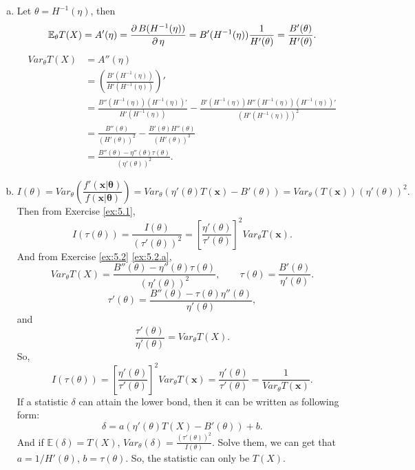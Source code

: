 \begin{solution}
    \begin{enumerate}[(a)]
        \item \label{ex:5.2.a} Let $\theta=H^{-1}(\eta)$, then 
        \[
            \mathbb{E}_\theta T(X) = A'(\eta) =\frac{\partial\, B(H^{-1}(\eta))}{\partial\, \eta}=B'(H^{-1}(\eta))\frac{1}{H'(\theta)}=\frac{B'(\theta)}{H'(\theta)}. 
        \]
        \[
            \begin{aligned}
                Var_\theta T(X)&=A''(\eta)\\
                &=\left(\frac{B'(H^{-1}(\eta))}{H'(H^{-1}(\eta))}\right)'\\
                &=\frac{B''(H^{-1}(\eta))(H^{-1}(\eta))'}{H'(H^{-1}(\eta))}-\frac{B'(H^{-1}(\eta))H''(H^{-1}(\eta))(H^{-1}(\eta))'}{\left(H'(H^{-1}(\eta))\right)^2}\\
                &=\frac{B''(\theta)}{(H'(\theta))^2}-\frac{B'(\theta)H''(\theta)}{(H'(\theta))^3}\\
                &=\frac{B''(\theta)-\eta''(\theta)\tau(\theta)}{(\eta'(\theta))^2}. 
            \end{aligned}
        \]
        \item \[
            I(\theta)=Var_\theta\left(\frac{f'(\mathbf{x|\theta})}{f(\mathbf{x|\theta})}\right)=Var_{\theta}(\eta'(\theta)T(\mathbf{x})-B'(\theta))=Var_\theta(T(\mathbf{x}))(\eta'(\theta))^2. 
        \]
        Then from Exercise \ref{ex:5.1}, 
        \begin{equation}
            I(\tau(\theta))=\frac{I(\theta)}{(\tau'(\theta))^2}=\left[\frac{\eta'(\theta)}{\tau'(\theta)}\right]^2Var_\theta T(\mathbf{x}). 
            \label{eq:5.2.1}
        \end{equation}
        And from Exercise \ref{ex:5.2} \ref{ex:5.2.a},
        \[
            Var_\theta T(X)=\frac{B''(\theta)-\eta''(\theta)\tau(\theta)}{(\eta'(\theta))^2}, \qquad \tau(\theta)=\frac{B'(\theta)}{\eta'(\theta)}. 
        \]
        \[
            \tau'(\theta)=\frac{B''(\theta)-\tau(\theta)\eta''(\theta)}{\eta'(\theta)}, 
        \]
        and \[
            \frac{\tau'(\theta)}{\eta'(\theta)}=Var_\theta T(X).
        \]
        So, 
        \[
            I(\tau(\theta))=\left[\frac{\eta'(\theta)}{\tau'(\theta)}\right]^2Var_\theta T(\mathbf{x})=\frac{\eta'(\theta)}{\tau'(\theta)}=\frac{1}{Var_\theta T(\mathbf{x})}. 
        \]
        If a statistic $\delta$ can attain the lower bond, then it can be written as following form: 
        \[
           \delta=a\left(\eta'(\theta)T(X)-B'(\theta)\right)+b.
        \]
        And if $\mathbb{E}(\delta)=T(X)$, $Var_\theta(\delta)=\frac{(\tau'(\theta))^2}{I(\theta)}$. Solve them, we can get that $a=1/H'(\theta)$, $b=\tau(\theta)$. So, the statistic can only be $T(X)$. 
    \end{enumerate}
\end{solution}

